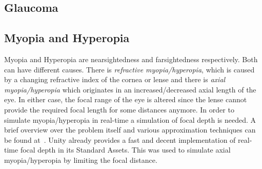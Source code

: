 \documentclass{acm_proc_article-sp}
\begin{document}
\subsection{Glaucoma}
\subsection{Myopia and Hyperopia}
Myopia and Hyperopia are nearsightedness and farsightedness respectively.
Both can have different causes.
There is \emph{refractive myopia/hyperopia}, which is caused by a changing refractive index of the cornea or lense and there is \emph{axial myopia/hyperopia} which originates in an increased/decreased axial length of the eye.
In either case, the focal range of the eye is altered since the lense cannot provide the required focal length for some distances anymore.
%
In order to simulate myopia/hyperopia in real-time a simulation of focal depth is needed.
A brief overview over the problem itself and various approximation techniques can be found at~\cite{gpugems-DoF}.
%
Unity already provides a fast and decent implementation of real-time focal depth in its Standard Assets.
This was used to simulate axial myopia/hyperopia by limiting the focal distance.
\end{document}

